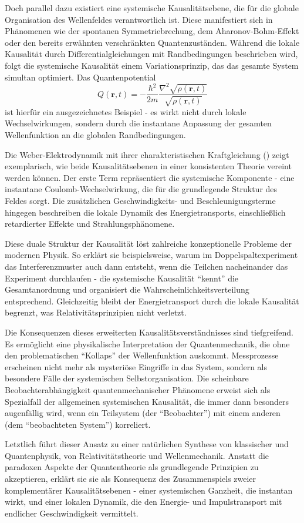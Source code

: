 Doch parallel dazu existiert eine systemische Kausalitätsebene, die für die globale Organisation des Wellenfeldes verantwortlich ist. Diese manifestiert sich in Phänomenen wie der
spontanen Symmetriebrechung, dem Aharonov-Bohm-Effekt oder den bereits erwähnten verschränkten Quantenzuständen. Während die lokale Kausalität durch Differentialgleichungen mit
Randbedingungen beschrieben wird, folgt die systemische Kausalität einem Variationsprinzip, das das gesamte System simultan optimiert.
Das Quantenpotential
\[
Q(\mathbf{r},t) = -\frac{\hbar^2}{2m} \frac{\nabla^2 \sqrt{\rho(\mathbf{r},t)}}{\sqrt{\rho(\mathbf{r},t)}}
\]
ist hierfür ein ausgezeichnetes Beispiel - es wirkt nicht durch lokale Wechselwirkungen, sondern durch die instantane Anpassung der gesamten
Wellenfunktion an die globalen Randbedingungen.

Die Weber-Elektrodynamik mit ihrer charakteristischen Kraftgleichung () zeigt exemplarisch, wie beide Kausalitätsebenen in einer konsistenten Theorie vereint werden können.
Der erste Term repräsentiert die systemische Komponente - eine instantane Coulomb-Wechselwirkung, die für die grundlegende Struktur des Feldes sorgt. Die zusätzlichen Geschwindigkeits- und
Beschleunigungsterme hingegen beschreiben die lokale Dynamik des Energietransports, einschließlich retardierter Effekte und Strahlungsphänomene.

Diese duale Struktur der Kausalität löst zahlreiche konzeptionelle Probleme der modernen Physik. So erklärt sie beispielsweise, warum im Doppelspaltexperiment das Interferenzmuster
auch dann entsteht, wenn die Teilchen nacheinander das Experiment durchlaufen - die systemische Kausalität \enquote{kennt} die Gesamtanordnung und organisiert die Wahrscheinlichkeitsverteilung
entsprechend. Gleichzeitig bleibt der Energietransport durch die lokale Kausalität begrenzt, was Relativitätsprinzipien nicht verletzt.

Die Konsequenzen dieses erweiterten Kausalitätsverständnisses sind tiefgreifend. Es ermöglicht eine physikalische Interpretation der Quantenmechanik, die ohne den problematischen
\enquote{Kollaps} der Wellenfunktion auskommt. Messprozesse erscheinen nicht mehr als mysteriöse Eingriffe in das System, sondern als besondere Fälle der systemischen Selbstorganisation.
Die scheinbare Beobachterabhängigkeit quantenmechanischer Phänomene erweist sich als Spezialfall der allgemeinen systemischen Kausalität, die immer dann besonders augenfällig wird, wenn
ein Teilsystem (der \enquote{Beobachter}) mit einem anderen (dem \enquote{beobachteten System}) korreliert.

Letztlich führt dieser Ansatz zu einer natürlichen Synthese von klassischer und Quantenphysik, von Relativitätstheorie und Wellenmechanik. Anstatt die paradoxen Aspekte der Quantentheorie
als grundlegende Prinzipien zu akzeptieren, erklärt sie sie als Konsequenz des Zusammenspiels zweier komplementärer Kausalitätsebenen - einer systemischen Ganzheit, die instantan wirkt,
und einer lokalen Dynamik, die den Energie- und Impulstransport mit endlicher Geschwindigkeit vermittelt.
